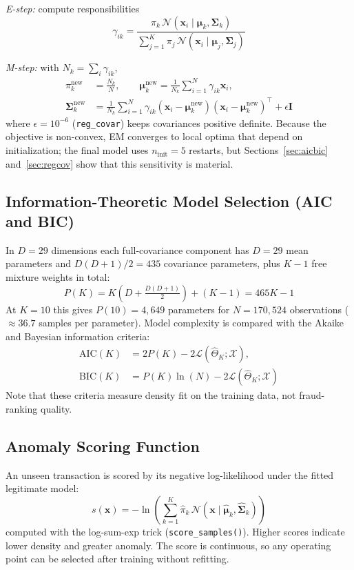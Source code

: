 \documentclass[conference]{IEEEtran}
\begin{document}
\textit{E-step:} compute responsibilities
\begin{equation}
\gamma_{ik} = \frac{\pi_k \, \mathcal{N}(\mathbf{x}_i \mid \boldsymbol{\mu}_k, \boldsymbol{\Sigma}_k)}{\sum_{j=1}^{K} \pi_j \, \mathcal{N}(\mathbf{x}_i \mid \boldsymbol{\mu}_j, \boldsymbol{\Sigma}_j)}
\end{equation}

\textit{M-step:} with $N_k = \sum_i \gamma_{ik}$,
\begin{align}
\pi_k^{\text{new}} &= \frac{N_k}{N}, \qquad \boldsymbol{\mu}_k^{\text{new}} = \frac{1}{N_k} \sum_{i=1}^{N} \gamma_{ik} \mathbf{x}_i, \\
\boldsymbol{\Sigma}_k^{\text{new}} &= \frac{1}{N_k} \sum_{i=1}^{N} \gamma_{ik} (\mathbf{x}_i - \boldsymbol{\mu}_k^{\text{new}})(\mathbf{x}_i - \boldsymbol{\mu}_k^{\text{new}})^{\top} + \epsilon \mathbf{I}
\end{align}
where $\epsilon = 10^{-6}$ (\texttt{reg\_covar}) keeps covariances positive definite. Because the objective is non-convex, EM converges to local optima that depend on initialization; the final model uses $n_{\text{init}} = 5$ restarts, but Sections~\ref{sec:aicbic} and~\ref{sec:regcov} show that this sensitivity is material.

\subsection{Information-Theoretic Model Selection (AIC and BIC)}
In $D = 29$ dimensions each full-covariance component has $D = 29$ mean parameters and $D(D+1)/2 = 435$ covariance parameters, plus $K-1$ free mixture weights in total:
\begin{equation}
P(K) = K \left( D + \tfrac{D(D+1)}{2} \right) + (K - 1) = 465K - 1
\end{equation}
At $K = 10$ this gives $P(10) = 4{,}649$ parameters for $N = 170{,}524$ observations ($\approx 36.7$ samples per parameter). Model complexity is compared with the Akaike \cite{akaike1974} and Bayesian \cite{schwarz1978} information criteria:
\begin{align}
\text{AIC}(K) &= 2P(K) - 2\mathcal{L}(\hat{\Theta}_K; \mathcal{X}), \\
\text{BIC}(K) &= P(K)\ln(N) - 2\mathcal{L}(\hat{\Theta}_K; \mathcal{X})
\end{align}
Note that these criteria measure density fit on the training data, not fraud-ranking quality.

\subsection{Anomaly Scoring Function}
An unseen transaction is scored by its negative log-likelihood under the fitted legitimate model:
\begin{equation}
s(\mathbf{x}) = -\ln \left( \sum_{k=1}^{K} \hat{\pi}_k \, \mathcal{N}(\mathbf{x} \mid \hat{\boldsymbol{\mu}}_k, \hat{\boldsymbol{\Sigma}}_k) \right)
\end{equation}
computed with the log-sum-exp trick (\texttt{score\_samples()}). Higher scores indicate lower density and greater anomaly. The score is continuous, so any operating point can be selected after training without refitting.
\end{document}
